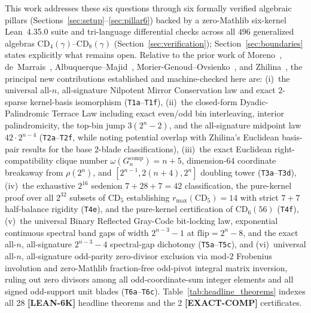 \documentclass[11pt,reqno]{amsart}
\theoremstyle{plain}
\theoremstyle{definition}
\theoremstyle{remark}
\newcommand{\tagLean}{\mbox{\textsf{\textbf{\color{oiBlue}[LEAN-6K]}}}}
\newcommand{\tagComp}{\mbox{\textsf{\textbf{\color{oiGreen}[EXACT-COMP]}}}}
\newcommand{\CD}{\mathrm{CD}}
\newcommand{\comp}{\mathrm{comp}}
\newcommand{\flip}{\mathrm{flip}}
\begin{document}
This work addresses these six questions through six formally verified algebraic pillars
(Sections~\ref{sec:setup}--\ref{sec:pillar6}) backed
by a zero-Mathlib six-kernel Lean~4.35.0 suite and tri-language differential checks across all
$496$ generalized algebras $\CD_4(\gamma)$--$\CD_8(\gamma)$ (Section~\ref{sec:verification});
Section~\ref{sec:boundaries} states explicitly what remains open. Relative to the prior work of Moreno~\cite{moreno1998,moreno2004},
de~Marrais~\cite{demarrais2000,demarrais2002}, Albuquerque--Majid~\cite{albuquerque1999},
Morier-Genoud--Ovsienko~\cite{moriergenoud2011}, and Zhilina~\cite{zhilina2021i,zhilina2021ii},
the principal new contributions established and machine-checked here are: (i)~the universal
all-$n$, all-signature Nilpotent Mirror Conservation law and exact $2$-sparse kernel-basis
isomorphism (\texttt{T1a}--\texttt{T1f}), (ii)~the closed-form Dyadic-Palindromic Terrace Law
including exact even/odd bin interleaving, interior palindromicity, the top-bin jump $3(2^n-2)$,
and the all-signature midpoint law $42 \cdot 2^{n-4}$ (\texttt{T2a}--\texttt{T2f}, while noting
potential overlap with Zhilina's Euclidean basis-pair results for the base $2$-blade
classifications), (iii)~the exact Euclidean right-compatibility clique number $\omega(G_n^{\comp}) = n+5$,
dimension-$64$ coordinate breakaway from $\rho(2^n)$, and $[2^{n-1}, 2(n+4), 2^n]$ doubling
tower (\texttt{T3a}--\texttt{T3d}), (iv)~the exhaustive $2^{16}$ sedenion $7+28+7=42$
classification, the pure-kernel proof over all $2^{32}$ subsets of $\CD_5$ establishing
$r_{\max}(\CD_5) = 14$ with strict $7+7$ half-balance rigidity (\texttt{T4e}), and the
pure-kernel certification of $\CD_6(56)$ (\texttt{T4f}), (v)~the universal Binary Reflected
Gray-Code bit-locking law, exponential continuous spectral band gaps of width $2^{n-3}-1$ at
$\flip = 2^n - 8$, and the exact all-$n$, all-signature $2^{n-3}-4$ spectral-gap dichotomy
(\texttt{T5a}--\texttt{T5c}), and (vi)~universal all-$n$, all-signature odd-parity zero-divisor
exclusion via mod-$2$ Frobenius involution and zero-Mathlib fraction-free odd-pivot integral matrix
inversion, ruling out zero divisors among all odd-coordinate-sum integer elements and all signed
odd-support unit blades (\texttt{T6a}--\texttt{T6c}). Table~\ref{tab:headline_theorems} indexes
all 28 \tagLean{} headline theorems and the 2 \tagComp{} certificates.
\end{document}
